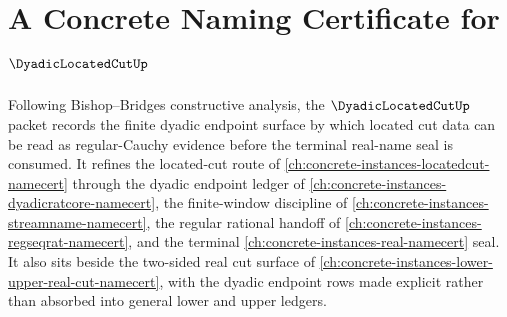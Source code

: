\chapter{A Concrete Naming Certificate for $\DyadicLocatedCutUp$}
\label{ch:concrete-instances-dyadic-located-cut-namecert}

Following Bishop--Bridges constructive analysis, the $\DyadicLocatedCutUp$ packet records the finite dyadic endpoint surface by which located cut data can be read as regular-Cauchy evidence before the terminal real-name seal is consumed. It refines the located-cut route of \autoref{ch:concrete-instances-locatedcut-namecert} through the dyadic endpoint ledger of \autoref{ch:concrete-instances-dyadicratcore-namecert}, the finite-window discipline of \autoref{ch:concrete-instances-streamname-namecert}, the regular rational handoff of \autoref{ch:concrete-instances-regseqrat-namecert}, and the terminal \autoref{ch:concrete-instances-real-namecert} seal. It also sits beside the two-sided real cut surface of \autoref{ch:concrete-instances-lower-upper-real-cut-namecert}, with the dyadic endpoint rows made explicit rather than absorbed into general lower and upper ledgers.

